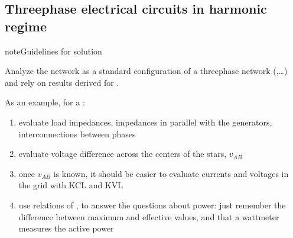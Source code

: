 \documentclass[letterpaper,10pt,italian]{jupyterBook}
\begin{document}
\sphinxstepscope


\subsection{Three\sphinxhyphen{}phase electrical circuits in harmonic regime}
\label{\detokenize{ch/electrical-engineering-exercises-three-phase:three-phase-electrical-circuits-in-harmonic-regime}}\label{\detokenize{ch/electrical-engineering-exercises-three-phase:classical-electromagnetism-electrical-engineering-exercises-three-phase}}\label{\detokenize{ch/electrical-engineering-exercises-three-phase::doc}}
\begin{sphinxadmonition}{note}{Guidelines for solution}

\sphinxAtStartPar
Analyze the network as a standard configuration of a three\sphinxhyphen{}phase network ({\hyperref[\detokenize{ch/electrical-engineering-three-phase:classical-electromagnetism-electrical-engineering-three-phase-star-star}]{}},…) and rely on results derived for {\hyperref[\detokenize{ch/electrical-engineering-three-phase:classical-electromagnetism-electrical-engineering-three-phase}]{}}.

\sphinxAtStartPar
As an example, for a :
\begin{enumerate}
%
\item {} 
\sphinxAtStartPar
evaluate load impedances, impedances in parallel with the generators, interconnections between phases

\item {} 
\sphinxAtStartPar
evaluate voltage difference across the centers of the stars, \(v_{AB}\)

\item {} 
\sphinxAtStartPar
once \(v_{AB}\) is known, it should be easier to evaluate currents and voltages in the grid with KCL and KVL

\item {} 
\sphinxAtStartPar
use relations of {\hyperref[\detokenize{ch/electrical-engineering-networks-harmonic:classical-electromagnetism-electrical-engineering-newtork-analysis-harmonic-power}]{}}, to answer the questions about power: just remember the difference between maximum and effective values, and that a wattmeter measures the active power

\end{enumerate}
\end{sphinxadmonition}
 \label{exercise:exam-24-09-06-exe-03}
\end{document}
